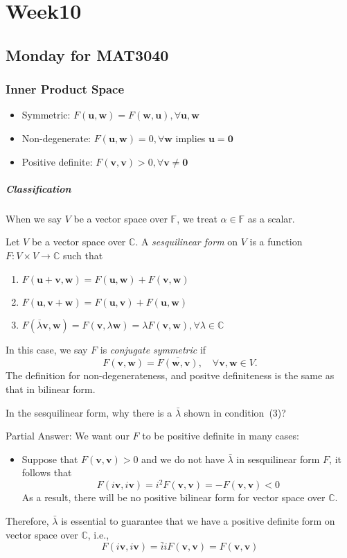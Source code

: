 \chapter{Week10}
\section{Monday for MAT3040}
\subsection{Inner Product Space}
\begin{itemize}
\item
Symmetric: $F(\bm u,\bm w)=F(\bm w,\bm u),\forall\bm u,\bm w$
\item
Non-degenerate: $F(\bm u,\bm w)=0,\forall\bm w$ implies $\bm u=\bm0$
\item
Positive definite: $F(\bm v,\bm v)>0,\forall\bm v\ne\bm0$
\end{itemize}
\paragraph{Classification}
When we say $V$ be a vector space over $\mathbb{F}$, we treat $\alpha\in\mathbb{F}$ as a scalar.
\begin{definition}
Let $V$ be a vector space over $\mathbb{C}$.
A \emph{sesquilinear form} on $V$ is a function $F:V\times V\to\mathbb{C}$ such that
\begin{enumerate}
\item
$F(\bm u+\bm v,\bm w)=F(\bm u,\bm w)+F(\bm v,\bm w)$
\item
$F(\bm u,\bm v+\bm w)=F(\bm u,\bm v)+F(\bm u,\bm w)$
\item
$F(\overline{\lambda}\bm v,\bm w)=F(\bm v,\lambda\bm w)=\lambda F(\bm v,\bm w),\forall\lambda\in\mathbb{C}$
\end{enumerate}
In this case, we say $F$ is \emph{conjugate symmetric} if
\[
F(\bm v,\bm w)=\overline{F(\bm w,\bm v)},\quad\forall \bm v,\bm w\in V.
\]
The definition for non-degenerateness, and positve definiteness is the same as that in bilinear form.
\end{definition}
\begin{remark}
In the sesquilinear form, why there is a $\bar{\lambda}$ shown in condition~(3)?

Partial Answer: We want our $F$ to be positive definite in many cases:
\begin{itemize}
\item
Suppose that $F(\bm v,\bm v)>0$ and we do not have $\bar{\lambda}$ in sesquilinear form $F$, it follows that
\[F(i\bm v,i\bm v) = i^2F(\bm v,\bm v)=-F(\bm v,\bm v)<0\]
As a result, there will be no positive bilinear form for vector space over $\mathbb{C}$.
\end{itemize}
Therefore, $\bar{\lambda}$ is essential to guarantee that we have a positive definite form on vector space over $\mathbb{C}$, i.e.,
\[
F(i\bm v,i\bm v)=\bar{i}iF(\bm v,\bm v)=F(\bm v,\bm v)
\]
\end{remark}

